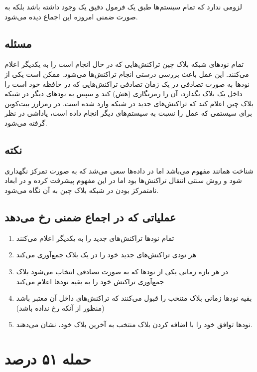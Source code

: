 \documentclass[10pt, a4paper]{article}
\begin{document}
لزومی ندارد که تمام سیستم‌ها طبق یک فرمول دقیق یک  وجود داشته باشد
بلکه به صورت ضمنی امروزه این اجماع دیده می‌شود.

\subsection{مسئله }

تمام نود‌های شبکه بلاک چین تراکنش‌هایی که در حال انجام است را به یکدیگر اعلام
می‌کنند. این عمل باعث بررسی درستی انجام تراکنش‌ها می‌شود. ممکن است یکی از نود‌ها
به صورت تصادفی در یک زمان تصادفی تراکنش‌هایی که در حافظه خود است را داخل یک بلاک
بگذارد، آن را رمزنگاری (هش) کند و سپس به نود‌های دیگر در شبکه بلاک چین اعلام کند
که تراکنش‌های جدید در شبکه وارد شده است. در رمزارز بیت‌کوین برای سیستمی که عمل
 را نسبت به سیستم‌های دیگر انجام داده است، پاداشی در نظر گرفته
می‌شود.

\subsection*{نکته}

شناخت  همانند مفهوم  می‌باشد اما در  داده‌ها
سعی می‌شد که به صورت تمرکز نگهداری شود و روش سنتی انتقال تراکنش‌ها بود اما در
 این مفهوم پیشرفت کرده و در ابعاد نامتمرکز بودن در شبکه بلاک چین به
آن نگاه می‌شود.

\subsection*{عملیاتی که در اجماع ضمنی رخ می‌دهد}

\begin{enumerate}
    \item تمام نود‌ها تراکنش‌های جدید را به یکدیگر اعلام می‌کنند
    \item هر نودی تراکنش‌های جدید خود را در یک بلاک جمع‌آوری می‌کند
    \item در هر بازه زمانی یکی از نود‌ها که به صورت تصادفی انتخاب می‌شود بلاک
    جمع‌آوری تراکنش خود را به بقیه نود‌ها اعلام می‌کند
    \item بقیه نود‌ها زمانی بلاک منتخب را قبول می‌کنند که تراکنش‌های داخل آن
    معتبر باشد (منظور از آنکه  رخ نداده باشد)
    \item نود‌ها توافق خود را با اضافه کردن بلاک منتخب به آخرین بلاک خود، نشان
    می‌دهند.
\end{enumerate}

\section{حمله ۵۱ درصد}
\end{document}
